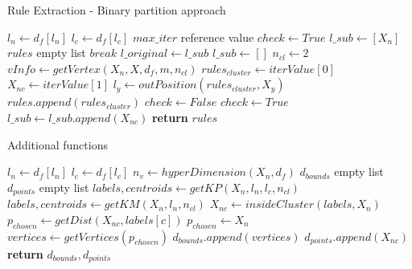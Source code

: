 \begin{algorithm}[]
\caption{Rule Extraction - Binary partition approach}\label{alg:annex-oneclass-split}
\begin{algorithmic}[1]
    \State $ l_n \gets d_{f}[l_n]$
    \State $ l_c \gets d_{f}[l_c]$
    \State $max\_iter$ reference value
    \State $check \gets True$
    \State $l\_sub \gets [X_n]$
    \State $rules$ empty list
            \State $break$
        \EndIf
        \State $l\_{original} \gets l\_sub$
        \State $l\_sub \gets []$ 
            \State $ n_{cl} \gets 2$
            \State $vInfo \gets getVertex(X_n, X,  d_f, m, n_{cl})$
                \State $rules_{cluster} \gets iterValue[0]$
                \State $X_{nc} \gets iterValue[1]$
                \State $l_{y} \gets outPosition(rules_{cluster}, X_y)$
                    \State $rules.append(rules_{cluster})$
                    \State $check \gets False$
                \Else
                    \State $check \gets True$
                    \State $l\_sub \gets l\_sub.append(X_{nc})$
                \EndIf\label{check_anomalies_positions2}
            \EndFor\label{itercluster2}
        \EndFor\label{}
    \EndWhile\label{}
    \State \textbf{return} $rules$
\EndProcedure
\end{algorithmic}
\end{algorithm}

\begin{algorithm}[]
\caption{Additional functions}\label{alg:annex-additional}
\begin{algorithmic}[1]
    \State $ l_n \gets d_{f}[l_n]$
    \State $ l_c \gets d_{f}[l_c]$
    \State $n_v \gets hyperDimension(X_n, d_f)$
    \State $d_{bounds}$ empty list
    \State $d_{points}$ empty list
        \State $labels, centroids \gets getKP(X_n, l_n, l_c, n_{cl})$
    \Else
        \State $labels, centroids \gets getKM(X_n, l_n, n_{cl})$
    \EndIf\label{choose_clustering}
        \State $X_{nc} \gets insideCluster(labels, X_n)$
            \State $p_{chosen} \gets getDist(X_{nc}, labels[c])$
        \Else
            \State $p_{chosen} \gets X_n$
        \EndIf\label{compute_vertices}
        \State $vertices \gets getVertices(p_{chosen})$
        \State $d_{bounds}.append(vertices)$
        \State $d_{points}.append(X_{nc})$
    \EndFor\label{iter_all_clusters}
    \State \textbf{return} $d_{bounds}, d_{points}$
\EndProcedure
\end{algorithmic}
\end{algorithm}

